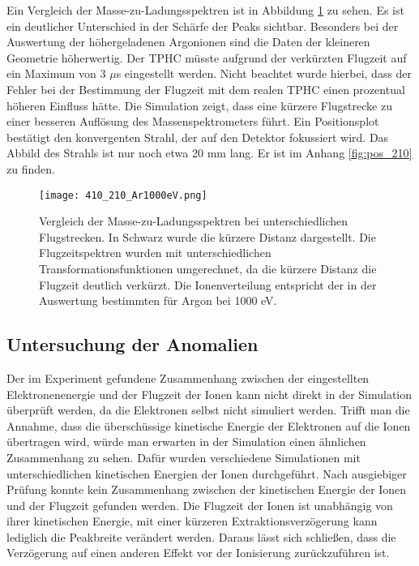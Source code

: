 Ein Vergleich der Masse-zu-Ladungsspektren ist in Abbildung \ref{fig:410_210} zu sehen. Es ist ein deutlicher Unterschied in der Schärfe der Peaks sichtbar. Besonders bei der Auswertung der höhergeladenen Argonionen sind die Daten der kleineren Geometrie höherwertig. Der TPHC müsste aufgrund der verkürzten Flugzeit auf ein Maximum von 3 $\mu$s eingestellt werden. Nicht beachtet wurde hierbei, dass der Fehler bei der Bestimmung der Flugzeit mit dem realen TPHC einen prozentual höheren Einfluss hätte. Die Simulation zeigt, dass eine kürzere Flugstrecke zu einer besseren Auflösung des Massenspektrometers führt. Ein Positionsplot bestätigt den konvergenten Strahl, der auf den Detektor fokussiert wird. Das Abbild des Strahls ist nur noch etwa 20 mm lang. Er ist im Anhang \ref{fig:pos_210} zu finden.

\begin{landscape}
    \begin{figure}
        \centering
        \hspace*{-2.5cm}\texttt{[image: 410\_210\_Ar1000eV.png]}
        \caption[Vergleich der Masse-zu-Ladungsspektren bei unterschiedlichen Flugstrecken]{Vergleich der Masse-zu-Ladungsspektren bei unterschiedlichen Flugstrecken. In Schwarz wurde die kürzere Distanz dargestellt. Die Flugzeitspektren wurden mit unterschiedlichen Transformationsfunktionen umgerechnet, da die kürzere Distanz die Flugzeit deutlich verkürzt. Die Ionenverteilung entspricht der in der Auswertung bestimmten für Argon bei 1000 eV.}
        \label{fig:410_210}
    \end{figure}
\end{landscape}

\subsection{Untersuchung der Anomalien}
Der im Experiment gefundene Zusammenhang zwischen der eingestellten Elektronenenergie und der Flugzeit der Ionen kann nicht direkt in der Simulation überprüft werden, da die Elektronen selbst nicht simuliert werden. Trifft man die Annahme, dass die überschüssige kinetische Energie der Elektronen auf die Ionen übertragen wird, würde man erwarten in der Simulation einen ähnlichen Zusammenhang zu sehen. Dafür wurden verschiedene Simulationen mit unterschiedlichen kinetischen Energien der Ionen durchgeführt. Nach ausgiebiger Prüfung konnte kein Zusammenhang zwischen der kinetischen Energie der Ionen und der Flugzeit gefunden werden. Die Flugzeit der Ionen ist unabhängig von ihrer kinetischen Energie, mit einer kürzeren Extraktionsverzögerung kann lediglich die Peakbreite verändert werden. Daraus lässt sich schließen, dass die Verzögerung auf einen anderen Effekt vor der Ionisierung zurückzuführen ist. 

